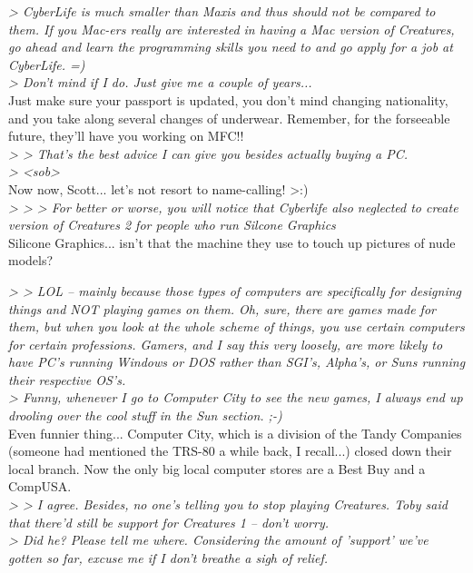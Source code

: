 \documentclass[11pt,twoside,a4paper]{article}
\begin{document}
\begin{multicols*}{2}
\emph{> CyberLife is much smaller than Maxis and thus should not be compared to them. If you Mac-ers really are interested in having a Mac version of Creatures, go ahead and learn the programming skills you need to and go apply for a job at CyberLife. =)}~\\
\emph{> Don't mind if I do. Just give me a couple of years...}~\\

Just make sure your passport is updated, you don't mind changing nationality, and you take along several changes of underwear. Remember, for the forseeable future, they'll have you working on MFC!!~\\

\emph{> > That's the best advice I can give you besides actually buying a PC.}~\\
\emph{> <sob>}~\\

Now now, Scott... let's not resort to name-calling! >:)~\\

\emph{> > >   For better or worse, you will notice that Cyberlife also neglected to create version of Creatures 2 for people who run Silcone Graphics}~\\

Silicone Graphics... isn't that the machine they use to touch up pictures of nude models?

\emph{> > LOL -- mainly because those types of computers are specifically for designing things and NOT playing games on them. Oh, sure, there are games made for them, but when you look at the whole scheme of things, you use certain computers for certain professions. Gamers, and I say this very loosely, are more likely to have PC's running Windows or DOS rather than SGI's, Alpha's, or Suns running their respective OS's.}~\\
\emph{> Funny, whenever I go to Computer City to see the new games, I always end up drooling over the cool stuff in the Sun section. ;-)}~\\

Even funnier thing... Computer City, which is a division of the Tandy Companies (someone had mentioned the TRS-80 a while back, I recall...) closed down their local branch. Now the only big local computer stores are a Best Buy and a CompUSA.~\\

\emph{> > I agree. Besides, no one's telling you to stop playing Creatures. Toby said that there'd still be support for Creatures 1 -- don't worry.}~\\
\emph{> Did he? Please tell me where. Considering the amount of 'support' we've gotten so far, excuse me if I don't breathe a sigh of relief.}~\\


\end{multicols*}
\end{document}
